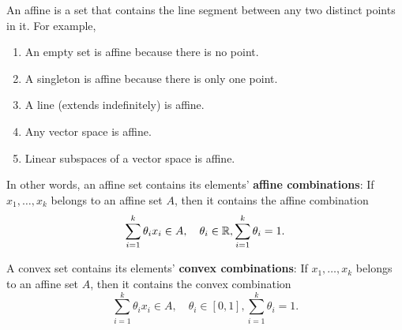 \begin{definition}
	An affine is a set that contains the line segment between any two distinct points in it. For example,
	\begin{enumerate}
		\item An empty set is affine because there is no point.
		\item A singleton is affine because there is only one point.
		\item A line (extends indefinitely) is affine.
		\item Any vector space is affine.
		\item Linear subspaces of a vector space is affine.	
	\end{enumerate} 

	\noindent In other words, an affine set contains its elements' \textbf{affine combinations}: If $x_1, \dots, x_k$ belongs to an affine set $A$, then it contains the affine combination
	\begin{equation}
		\sum_{i=1}^k\theta_i x_i\in A, \quad \theta_i\in\mathbb{R}, \sum_{i=1}^k\theta_i = 1.
	\end{equation} 
\end{definition} 

\begin{definition}
	A convex set contains its elements' \textbf{convex combinations}: If $x_1, \dots, x_k$ belongs to an affine set $A$, then it contains the convex combination
	\begin{equation}
		\sum_{i=1}^k\theta_i x_i\in A, \quad \theta_i\in [0, 1], \sum_{i=1}^k\theta_i = 1.	
	\end{equation} 
\end{definition} 



